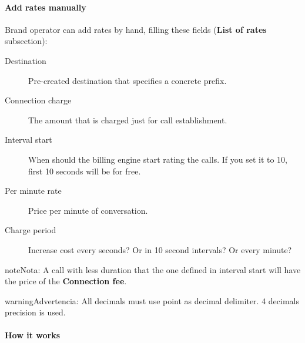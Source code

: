 \documentclass[letterpaper,10pt,spanish]{sphinxmanual}
\begin{document}
\paragraph{Add rates manually}
\label{administration_portal/brand/billing/destination_rates:add-rates-manually}
Brand operator can add rates by hand, filling these fields (\textbf{List of rates} subsection):
\begin{description}
\item[{Destination}] \leavevmode{}\label{administration_portal/brand/billing/destination_rates:term-destination}
Pre-created destination that specifies a concrete prefix.

\item[{Connection charge}] \leavevmode{}\label{administration_portal/brand/billing/destination_rates:term-connection-charge}
The amount that is charged just for call establishment.

\item[{Interval start}] \leavevmode{}\label{administration_portal/brand/billing/destination_rates:term-interval-start}
When should the billing engine start rating the calls. If you set it to 10, first 10 seconds will be for free.

\item[{Per minute rate}] \leavevmode{}\label{administration_portal/brand/billing/destination_rates:term-per-minute-rate}
Price per minute of conversation.

\item[{Charge period}] \leavevmode{}\label{administration_portal/brand/billing/destination_rates:term-charge-period}
Increase cost every seconds? Or in 10 second intervals? Or every minute?

\end{description}

\begin{notice}{note}{Nota:}
A call with less duration that the one defined in interval start will have the price of the \textbf{Connection fee}.
\end{notice}

\begin{notice}{warning}{Advertencia:}
All decimals must use point as decimal delimiter. 4 decimals precision is used.
\end{notice}
\paragraph{How it works}
\end{document}
